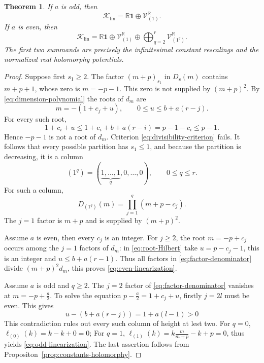 \documentclass[11pt,reqno]{amsart}
\newtheorem{theorem}{Theorem}[section]
\theoremstyle{corollary}
\theoremstyle{conjecture}
\theoremstyle{assumption}
\theoremstyle{proposition}
\theoremstyle{remark}
\numberwithin{equation}{section}
\begin{document}
\begin{theorem}\label{thm:linearization-repeat}
If $a$ is odd, then
\begin{equation}\label{eq:odd-linearization}
\mathcal K_{\operatorname{lin}}=\mathbb{R}\mathbf{1}\oplus \mathcal{V}_{(1)}^{\mathbb{R}}.
\end{equation}
If $a$ is even, then
\begin{equation}\label{eq:even-linearization}
\mathcal K_{\operatorname{lin}}=\mathbb{R}\mathbf{1}\oplus \mathcal{V}_{(1)}^{\mathbb{R}}\oplus \bigoplus_{q=2}^r \mathcal{V}_{(1^q)}^{\mathbb{R}}.
\end{equation}
The first two summands are precisely the infinitesimal constant rescalings and the normalized real holomorphy potentials.
\end{theorem}
\begin{proof}
Suppose first $s_1\geq 2$. The factor $(m+p)_{s_1}$ in $D_{\mathbf s}(m)$ contains $m+p+1$, whose zero is $m=-p-1$. This zero is not supplied by $(m+p)^2$. By \eqref{eq:dimension-polynomial} the roots of $d_m$ are
\begin{equation}\label{eq:root-Hilbert}
m=-(1+c_j+u),\qquad 0\leq u\leq b+a(r-j).
\end{equation}
For every such root,
\[
1+c_i+u\leq 1+c_i+b+a(r-i)=p-1-c_i\leq p-1.
\]
Hence $-p-1$ is not a root of $d_m$. Criterion \eqref{eq:divisibility-criterion} fails. It follows that every possible partition has $s_1\leq 1$, and because the partition is decreasing, it is a column
\[
(1^q)=(\underbrace{1,\ldots,1}_{q},0,\ldots,0),\qquad 0\leq q\leq r.
\]
For such a column,
\begin{equation}\label{eq:factor-denominator}
D_{(1^q)}(m)=\prod_{j=1}^{q}(m+p-c_j).
\end{equation}
The $j=1$ factor is $m+p$ and is supplied by $(m+p)^2$.

Assume $a$ is even, then every $c_j$ is an integer. For $j\geq 2$, the root $m=-p+c_j$ occurs among the $j=1$ factors of $d_m$: in \eqref{eq:root-Hilbert} take $u=p-c_j-1$, this is an integer and $u\leq b+a(r-1)$. Thus all factors in \eqref{eq:factor-denominator} divide $(m+p)^2d_m$, this proves \eqref{eq:even-linearization}.

Assume $a$ is odd and $q\geq 2$. The $j=2$ factor of \eqref{eq:factor-denominator} vanishes at $m=-p+\frac{a}{2}$. To solve the equation $p-\frac{a}{2}=1+c_j+u$, firstly $j=2l$ must be even. This gives
\[
u-\left(b+a(r-j)\right)=1+a(l-1)>0
\]
This contradiction rules out every such column of height at lest two. For $q=0$, $\ell_{(0)}(k)=k-k+0=0$; For $q=1$, $\ell_{(1)}(k)=k\frac{m}{m+p}-k+p=0$, thus yields \eqref{eq:odd-linearization}. The last assertion follows from Propositon~\ref{prop:constants-holomorphy}.
\end{proof}
\end{document}

